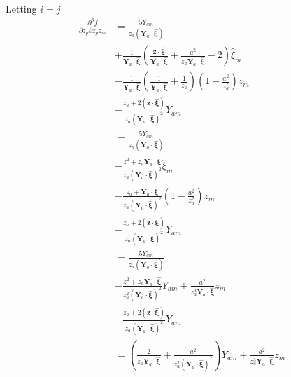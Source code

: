 \documentclass[10pt]{report}
\begin{document}
{Letting $i=j$
\begin{align}
\frac{\partial^3 f}{\partial  z_p\partial  z_p z_m}
&=\frac{5Y_{am}}{z_a(\bm Y_a\cdot \hat{\bm \xi})}\\
&+\frac{1}{\bm Y_a\cdot \hat{\bm \xi}}\left(\frac{\bm z\cdot{\hat{\bm \xi}}}{\bm Y_a\cdot \hat{\bm \xi}}+\frac{a^2}{z_a\bm Y_a\cdot \hat{\bm \xi}}-2\right)\hat{\xi}_m\\
&-\frac{1}{\bm Y_a\cdot \hat{\bm \xi}}\left(\frac{1}{\bm Y_a\cdot \hat{\bm \xi}}+\frac{1}{z_a}\right)\left(1-\frac{a^2}{z_a^2}\right)z_m\\
&-\frac{z_a+2(\bm z\cdot\hat{\bm \xi})}{z_a(\bm Y_a\cdot \hat{\bm \xi})^2}Y_{am}\nonumber\\
%
&=\frac{5Y_{am}}{z_a(\bm Y_a\cdot \hat{\bm \xi})}\\
&-\frac{z^2+z_a \bm Y_a\cdot \hat{\bm \xi}}{z_a(\bm Y_a\cdot \hat{\bm \xi})^2}\hat{\xi}_m\\
&-\frac{z_a+\bm Y_a\cdot \hat{\bm \xi}}{z_a(\bm Y_a\cdot \hat{\bm \xi})^2}\left(1-\frac{a^2}{z_a^2}\right)z_m\\
&-\frac{z_a+2(\bm z\cdot\hat{\bm \xi})}{z_a(\bm Y_a\cdot \hat{\bm \xi})^2}Y_{am}\\
%
&=\frac{5Y_{am}}{z_a(\bm Y_a\cdot \hat{\bm \xi})}\\
&-\frac{z^2+z_a\bm Y_a\cdot \hat{\bm \xi}}{z_a^2(\bm Y_a\cdot \hat{\bm \xi})^2}Y_{am}+\frac{a^2}{z_a^3 \bm Y_a\cdot \hat{\bm \xi}}z_m\nonumber\\
&-\frac{z_a+2(\bm z\cdot\hat{\bm \xi})}{z_a(\bm Y_a\cdot \hat{\bm \xi})^2}Y_{am}\nonumber\\
%
&=\left(\frac{2}{z_a\bm Y_a\cdot \hat{\bm \xi}}+\frac{a^2}{z_a^2(\bm Y_a\cdot \hat{\bm \xi})^2}\right)Y_{am}+\frac{a^2}{z_a^3 \bm Y_a\cdot \hat{\bm \xi}}z_m
\end{align}




}
\end{document}
